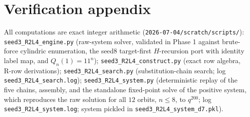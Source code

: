 \documentclass[11pt]{article}
\begin{document}
\section*{Verification appendix}

All computations are exact integer arithmetic
(\texttt{2026-07-04/scratch/scripts/}):
\texttt{seed3\_R2L4\_engine.py} (raw-system solver, validated in Phase 1 against
brute-force cylindric enumeration, the seed8 target-first $H$-recursion port with
identity label map, and $Q_n(1)=11^{n}$);
\texttt{seed3\_R2L4\_construct.py} (exact row algebra, R-row derivations);
\texttt{seed3\_R2L4\_search.py} (substitution-chain search; log
\texttt{seed3\_R2L4\_search.log});
\texttt{seed3\_R2L4\_system.py} (deterministic replay of the five chains,
assembly, and the standalone fixed-point solve of the positive system, which
reproduces the raw solution for all $12$ orbits, $n\le8$, to $q^{200}$; log
\texttt{seed3\_R2L4\_system.log}; system pickled in
\texttt{seed3\_R2L4\_system\_d7.pkl}).
\end{document}
